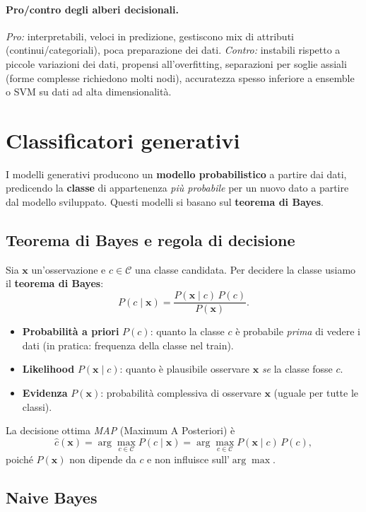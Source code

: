\paragraph{Pro/contro degli alberi decisionali.}
\emph{Pro:} interpretabili, veloci in predizione, gestiscono mix di attributi (continui/categoriali), poca preparazione dei dati. \emph{Contro:} instabili rispetto a piccole variazioni dei dati, propensi all’overfitting, separazioni per soglie assiali (forme complesse richiedono molti nodi), accuratezza spesso inferiore a ensemble o SVM su dati ad alta dimensionalità.


\section{Classificatori generativi}\label{sec:generative}
I modelli generativi producono un \textbf{modello probabilistico} a partire dai dati, predicendo la \textbf{classe} di appartenenza \emph{più probabile} per un nuovo dato a partire dal modello sviluppato. Questi modelli si basano sul \textbf{teorema di Bayes}.

\subsection{Teorema di Bayes e regola di decisione}\label{subsec:bayes-rule}
Sia $\mathbf{x}$ un’osservazione e $c\in\mathcal{C}$ una classe candidata. Per decidere la
classe usiamo il \textbf{teorema di Bayes}:
\[
P(c\mid \mathbf{x})=\frac{P(\mathbf{x}\mid c)\,P(c)}{P(\mathbf{x})}.
\]
\begin{itemize}
  \item \textbf{Probabilità a priori} $P(c)$: quanto la classe $c$ è probabile \emph{prima} di vedere i dati (in pratica: frequenza della classe nel train).
  \item \textbf{Likelihood} $P(\mathbf{x}\mid c)$: quanto è plausibile osservare $\mathbf{x}$ \emph{se} la classe fosse $c$.
  \item \textbf{Evidenza} $P(\mathbf{x})$: probabilità complessiva di osservare $\mathbf{x}$ (uguale per tutte le classi).
\end{itemize}
La decisione ottima \emph{MAP} (Maximum A Posteriori) è
\[
\hat{c}(\mathbf{x})=\arg\max_{c\in\mathcal{C}} P(c\mid \mathbf{x})
=\arg\max_{c\in\mathcal{C}} P(\mathbf{x}\mid c)\,P(c),
\]
poiché $P(\mathbf{x})$ non dipende da $c$ e non influisce sull’$\arg\max$.
\subsection{Naive Bayes}\label{subsec:naive-bayes}
